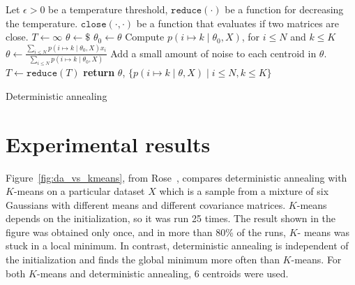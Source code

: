 \begin{algorithm}
\begin{algorithmic}[1]
\State Let
\State \qquad $\epsilon > 0$ be a temperature threshold,
\State \qquad $\texttt{reduce}(\cdot)$ be a function for decreasing the temperature.
\State \qquad $\texttt{close}\left(\cdot, \cdot\right)$ be a function that evaluates if two matrices are close.
\State $T \gets \infty$ 
\State $\theta \gets \$$ 
\Repeat
\State $\theta_0 \gets \theta$
\State Compute $p\left(i \mapsto k \mid \theta_0, X\right)$, for $i \leq N$ and $k \leq K$
\State $\displaystyle \theta \gets \frac{\sum_{i \leq N} p\left(i \mapsto k \mid \theta_0, X\right) x_i}{\sum_{i \leq N} p\left(i \mapsto k \mid \theta_0, X\right)}$
\State Add a small amount of noise to each centroid in $\theta$.
\State $T \gets \texttt{reduce}(T)$
\EndWhile
\State \textbf{return} $\theta$, $\{p\left(i \mapsto k \mid \theta, X\right) \mid i \leq N, k \leq K\}$
\EndFunction
\end{algorithmic}
\caption{Deterministic annealing}
\label{algo:da_algo_da}
\end{algorithm}

\section{Experimental results}
\label{sec:experiments}

Figure~\ref{fig:da_vs_kmeans}, from Rose~\cite{rose1991deterministic, rose1998deterministic}, compares deterministic annealing with $K$-means
on a particular dataset $X$ which is a sample from a mixture of six Gaussians
with different means and different covariance matrices. $K$-means depends
on the initialization, so it was run 25 times. The result shown in the
figure was obtained only once, and in more than 80\% of the runs, $K$-
means was stuck in a local minimum. In contrast, deterministic annealing
is independent of the initialization and finds the global minimum more
often than $K$-means. For both $K$-means and deterministic annealing, 6
centroids were used.


